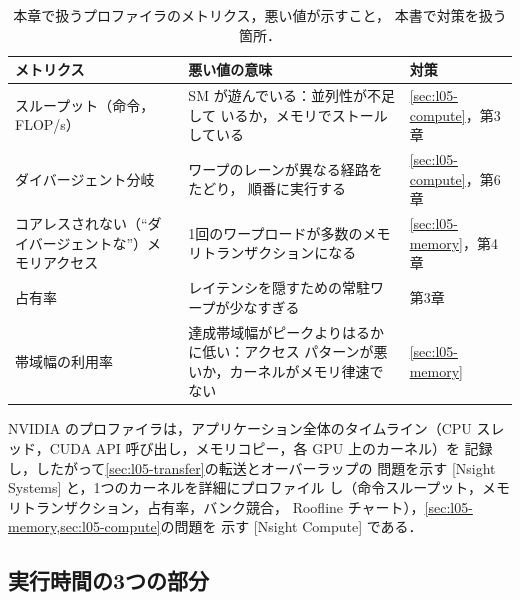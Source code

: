 \documentclass[../main.tex]{subfiles}
\begin{document}
\begin{table}[tb]
  \centering
  \small
  \caption{本章で扱うプロファイラのメトリクス，悪い値が示すこと，
    本書で対策を扱う箇所．}
  \label{tab:l05-metrics}
  \begin{tabular}{>{\raggedright\arraybackslash}p{28mm}
                  >{\raggedright\arraybackslash}p{52mm}
                  >{\raggedright\arraybackslash}p{26mm}}
    \toprule
    メトリクス & 悪い値の意味 & 対策 \\
    \midrule
    スループット（命令，FLOP/s） & SM が遊んでいる：並列性が不足して
      いるか，メモリでストールしている & \cref{sec:l05-compute}，第3章 \\
    ダイバージェント分岐 & ワープのレーンが異なる経路をたどり，
      順番に実行する & \cref{sec:l05-compute}，第6章 \\
    コアレスされない（\enquote{ダイバージェントな}）メモリアクセス &
      1回のワープロードが多数のメモリトランザクションになる &
      \cref{sec:l05-memory}，第4章 \\
    占有率 & レイテンシを隠すための常駐ワープが少なすぎる & 第3章 \\
    帯域幅の利用率 & 達成帯域幅がピークよりはるかに低い：アクセス
      パターンが悪いか，カーネルがメモリ律速でない &
      \cref{sec:l05-memory} \\
    \bottomrule
  \end{tabular}
\end{table}

\begin{definition}
  NVIDIA のプロファイラは，アプリケーション全体のタイムライン（CPU
  スレッド，CUDA API 呼び出し，メモリコピー，各 GPU 上のカーネル）を
  記録し，したがって\cref{sec:l05-transfer}の転送とオーバーラップの
  問題を示す
  [Nsight Systems]
  \cite{nvidia2026nsightsystems}と，1つのカーネルを詳細にプロファイル
  し（命令スループット，メモリトランザクション，占有率，バンク競合，
  Roofline チャート），\cref{sec:l05-memory,sec:l05-compute}の問題を
  示す
  [Nsight Compute]
  \cite{nvidia2026nsightcompute}である．
\end{definition}

\subsection{実行時間の3つの部分}
\end{document}
